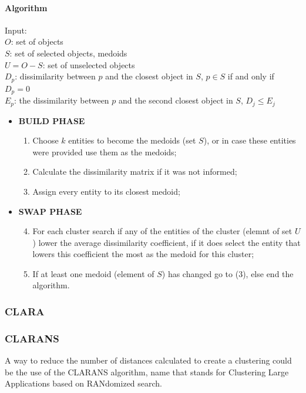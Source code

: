 \paragraph{Algorithm}
Input:\\
\(O\): set of objects\\
\(S\): set of selected objects, medoids\\
\(U = O - S\): set of unselected objects\\
\(D_p\): dissimilarity between \(p\) and the closest object in \(S\), \(p \in S\) if and only if \(D_p = 0\)\\
\(E_p\): the dissimilarity between \(p\) and the second closest object in \(S\), \(D_j \leq E_j\)
\begin{itemize}
    \item \textbf{BUILD PHASE}
    \begin{enumerate}
        \item Choose \(k\) entities to become the medoids (set \(S\)), or in case these entities were provided use them as the medoids;
        \item Calculate the dissimilarity matrix if it was not informed;
        \item Assign every entity to its closest medoid;
    \end{enumerate}
    \item \textbf{SWAP PHASE}
    \begin{enumerate}
        \setcounter{enumi}{3}
        \item For each cluster search if any of the entities of the cluster (elemnt of set \(U\)) lower the average dissimilarity coefficient, if it does select the entity that lowers this coefficient the most as the medoid for this cluster;
        \item If at least one medoid (element of \(S\)) has changed go to (3), else end the algorithm.
    \end{enumerate}
\end{itemize}
\subsubsection{CLARA} %
\subsubsection{CLARANS}
A way to reduce the number of distances calculated to create a clustering could be the use of the CLARANS algorithm, name that stands for Clustering Large Applications based on RANdomized search.

